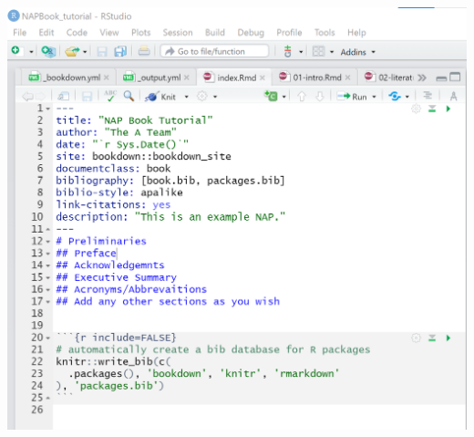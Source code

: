 \documentclass[
]{book}
\begin{document}
\includegraphics{tutorial_screenshots/edit_index.png}
\end{document}
